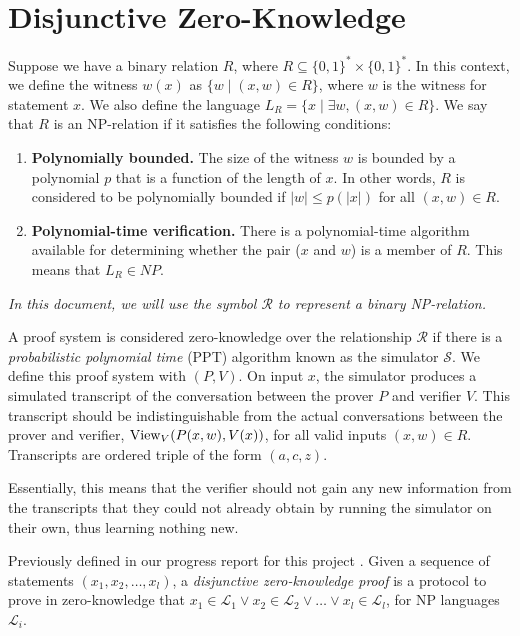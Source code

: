 \section{Disjunctive Zero-Knowledge}

\begin{definition}[NP Relations]
Suppose we have a binary relation $R$, where $R \subseteq \{0,1\}^* \times \{0,1\}^*$. 
In this context, we define the witness $w(x)$ as $\{w \mid (x,w) \in R\}$, where $w$ is the witness for statement $x$. We also define the language $L_R = \{x \mid \exists w, (x,w) \in R\}$. We say that $R$ is an NP-relation if it satisfies the following conditions:
\begin{enumerate}
    \item \textbf{Polynomially bounded.} The size of the witness $w$ is bounded by a polynomial $p$ that is a function of the length of $x$. In other words, $R$ is considered to be polynomially bounded if $|w| \le p(|x|)$ for all $(x,w) \in R$.
    \item \textbf{Polynomial-time verification.} There is a polynomial-time algorithm available for determining whether the pair ($x$ and $w$) is a member of $R$. This means that $L_R \in NP$.
\end{enumerate}
\textit{In this document, we will use the symbol $\mathcal R$ to represent a binary NP-relation.}

\end{definition}

\begin{definition}\label{def:zeroknowledge}
A proof system is considered zero-knowledge over the relationship $\mathcal R$ if there is a \textit{probabilistic polynomial time} (PPT) algorithm known as the simulator $\mathcal S$.  
We define this proof system with $(P, V)$. On input $x$, the simulator produces a simulated transcript of the conversation between the prover $P$ and verifier $V$. This transcript should be indistinguishable from the actual conversations between the prover and verifier, $\text{View}_V(P(x,w),V(x))$, for all valid inputs $(x,w) \in R$. Transcripts are ordered triple of the form $(a,c,z)$.

Essentially, this means that the verifier should not gain any new information from the transcripts that they could not already obtain by running the simulator on their own, thus learning nothing new.
\end{definition}


\begin{definition}
Previously defined in our progress report for this project \cite{prog-report}. Given a sequence of statements $(x_1,x_2,\ldots, x_l)$, a \textit{disjunctive zero-knowledge proof} is a protocol to 
prove in zero-knowledge that $x_1 \in \mathcal L_1 \lor x_2 \in \mathcal L_2 \lor \ldots \lor x_l \in \mathcal L_l$, for 
NP languages $\mathcal L_i$.
\end{definition}

